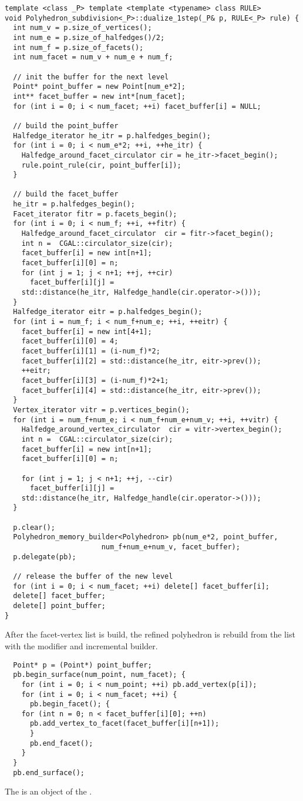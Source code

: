 \begin{lstlisting}
template <class _P> template <template <typename> class RULE>
void Polyhedron_subdivision<_P>::dualize_1step(_P& p, RULE<_P> rule) {
  int num_v = p.size_of_vertices();
  int num_e = p.size_of_halfedges()/2;
  int num_f = p.size_of_facets();
  int num_facet = num_v + num_e + num_f;
  
  // init the buffer for the next level
  Point* point_buffer = new Point[num_e*2];
  int** facet_buffer = new int*[num_facet];
  for (int i = 0; i < num_facet; ++i) facet_buffer[i] = NULL;

  // build the point_buffer
  Halfedge_iterator he_itr = p.halfedges_begin(); 
  for (int i = 0; i < num_e*2; ++i, ++he_itr) {
    Halfedge_around_facet_circulator cir = he_itr->facet_begin();
    rule.point_rule(cir, point_buffer[i]);
  }

  // build the facet_buffer
  he_itr = p.halfedges_begin(); 
  Facet_iterator fitr = p.facets_begin();  
  for (int i = 0; i < num_f; ++i, ++fitr) {
    Halfedge_around_facet_circulator  cir = fitr->facet_begin();
    int n =  CGAL::circulator_size(cir); 
    facet_buffer[i] = new int[n+1];
    facet_buffer[i][0] = n;
    for (int j = 1; j < n+1; ++j, ++cir)
      facet_buffer[i][j] = 
	std::distance(he_itr, Halfedge_handle(cir.operator->())); 
  }
  Halfedge_iterator eitr = p.halfedges_begin();
  for (int i = num_f; i < num_f+num_e; ++i, ++eitr) {
    facet_buffer[i] = new int[4+1];
    facet_buffer[i][0] = 4;
    facet_buffer[i][1] = (i-num_f)*2;
    facet_buffer[i][2] = std::distance(he_itr, eitr->prev());    
    ++eitr;
    facet_buffer[i][3] = (i-num_f)*2+1; 
    facet_buffer[i][4] = std::distance(he_itr, eitr->prev());    
  }
  Vertex_iterator vitr = p.vertices_begin();
  for (int i = num_f+num_e; i < num_f+num_e+num_v; ++i, ++vitr) {
    Halfedge_around_vertex_circulator  cir = vitr->vertex_begin();
    int n =  CGAL::circulator_size(cir); 
    facet_buffer[i] = new int[n+1];
    facet_buffer[i][0] = n;

    for (int j = 1; j < n+1; ++j, --cir)
      facet_buffer[i][j] = 
	std::distance(he_itr, Halfedge_handle(cir.operator->())); 
  }
  
  p.clear();
  Polyhedron_memory_builder<Polyhedron> pb(num_e*2, point_buffer, 
					   num_f+num_e+num_v, facet_buffer);
  p.delegate(pb);
  
  // release the buffer of the new level
  for (int i = 0; i < num_facet; ++i) delete[] facet_buffer[i];
  delete[] facet_buffer;
  delete[] point_buffer;
}
\end{lstlisting}
After the facet-vertex list is build, the refined polyhedron
is rebuild from the list with the modifier and 
incremental builder.
\begin{lstlisting}
  Point* p = (Point*) point_buffer;
  pb.begin_surface(num_point, num_facet); {
    for (int i = 0; i < num_point; ++i) pb.add_vertex(p[i]);	
    for (int i = 0; i < num_facet; ++i) {
      pb.begin_facet(); {
	for (int n = 0; n < facet_buffer[i][0]; ++n)
	  pb.add_vertex_to_facet(facet_buffer[i][n+1]);
      }
      pb.end_facet();
    }
  }
  pb.end_surface();
\end{lstlisting}
The  is an object of the 
.

